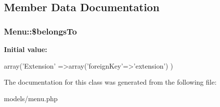 \subsection{\-Member \-Data \-Documentation}
\hypertarget{class_menu_a4f39f5fa18e6820335d10a18a5b8b1dc}{
\subsubsection[{\$belongs\-To}]{\setlength{\rightskip}{0pt plus 5cm}\-Menu\-::\$belongs\-To}}
\label{class_menu_a4f39f5fa18e6820335d10a18a5b8b1dc}
{\bfseries \-Initial value\-:}
\begin{DoxyCode}
 array('Extension'
                          =>array('foreignKey'=>'extension')
                          )
\end{DoxyCode}


\-The documentation for this class was generated from the following file\-:\begin{DoxyCompactItemize}
\item 
models/menu.\-php\end{DoxyCompactItemize}

